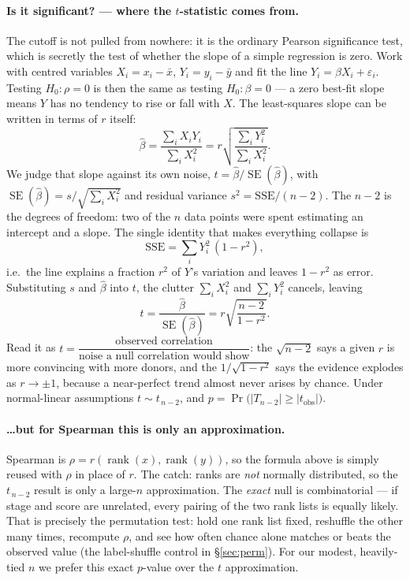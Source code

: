 \documentclass[11pt]{article}
\begin{document}
\paragraph{Is it significant? --- where the $t$-statistic comes from.} The cutoff is not pulled from nowhere: it is the ordinary Pearson significance test, which is secretly the test of whether the slope of a simple regression is zero. Work with centred variables $X_i=x_i-\bar x$, $Y_i=y_i-\bar y$ and fit the line $Y_i=\beta X_i+\varepsilon_i$. Testing $H_0:\rho=0$ is then the same as testing $H_0:\beta=0$ --- a zero best-fit slope means $Y$ has no tendency to rise or fall with $X$. The least-squares slope can be written in terms of $r$ itself:
\[
\hat\beta=\frac{\sum_i X_iY_i}{\sum_i X_i^2}=r\sqrt{\frac{\sum_i Y_i^2}{\sum_i X_i^2}}.
\]
We judge that slope against its own noise, $t=\hat\beta/\operatorname{SE}(\hat\beta)$, with $\operatorname{SE}(\hat\beta)=s/\sqrt{\sum_i X_i^2}$ and residual variance $s^2=\mathrm{SSE}/(n-2)$. The $n-2$ is the degrees of freedom: two of the $n$ data points were spent estimating an intercept and a slope. The single identity that makes everything collapse is
\[
\mathrm{SSE}=\sum_i Y_i^2\,(1-r^2),
\]
i.e.\ the line explains a fraction $r^2$ of $Y$'s variation and leaves $1-r^2$ as error. Substituting $s$ and $\hat\beta$ into $t$, the clutter $\sum_i X_i^2$ and $\sum_i Y_i^2$ cancels, leaving
\[
t=\frac{\hat\beta}{\operatorname{SE}(\hat\beta)}=r\sqrt{\frac{n-2}{1-r^2}}.
\]
Read it as $t=\dfrac{\text{observed correlation}}{\text{noise a null correlation would show}}$: the $\sqrt{n-2}$ says a given $r$ is more convincing with more donors, and the $1/\sqrt{1-r^2}$ says the evidence explodes as $r\to\pm1$, because a near-perfect trend almost never arises by chance. Under normal-linear assumptions $t\sim t_{\,n-2}$, and $p=\Pr\!\big(|T_{n-2}|\ge|t_{\text{obs}}|\big)$.

\paragraph{\dots but for Spearman this is only an approximation.} Spearman is $\rho=r(\operatorname{rank}(x),\operatorname{rank}(y))$, so the formula above is simply reused with $\rho$ in place of $r$. The catch: ranks are \emph{not} normally distributed, so the $t_{\,n-2}$ result is only a large-$n$ approximation. The \emph{exact} null is combinatorial --- if stage and score are unrelated, every pairing of the two rank lists is equally likely. That is precisely the permutation test: hold one rank list fixed, reshuffle the other many times, recompute $\rho$, and see how often chance alone matches or beats the observed value (the label-shuffle control in \S\ref{sec:perm}). For our modest, heavily-tied $n$ we prefer this exact $p$-value over the $t$ approximation.
\end{document}
